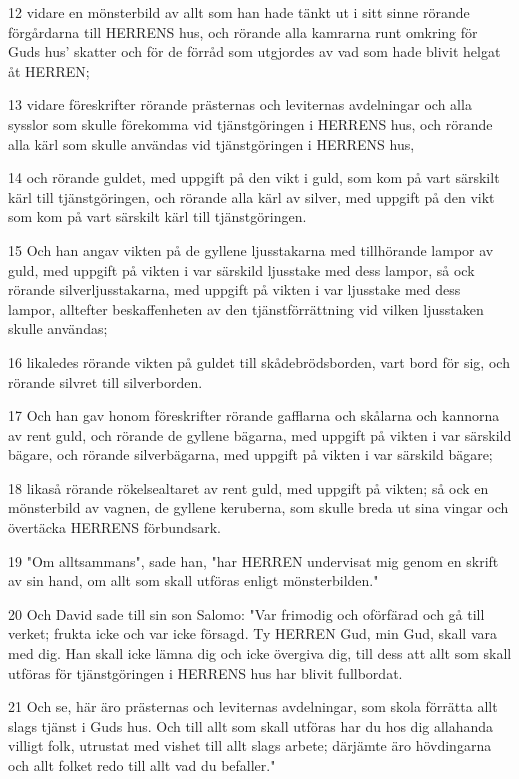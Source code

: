 \par 12 vidare en mönsterbild av allt som han hade tänkt ut i sitt sinne rörande förgårdarna till HERRENS hus, och rörande alla kamrarna runt omkring för Guds hus' skatter och för de förråd som utgjordes av vad som hade blivit helgat åt HERREN;
\par 13 vidare föreskrifter rörande prästernas och leviternas avdelningar och alla sysslor som skulle förekomma vid tjänstgöringen i HERRENS hus, och rörande alla kärl som skulle användas vid tjänstgöringen i HERRENS hus,
\par 14 och rörande guldet, med uppgift på den vikt i guld, som kom på vart särskilt kärl till tjänstgöringen, och rörande alla kärl av silver, med uppgift på den vikt som kom på vart särskilt kärl till tjänstgöringen.
\par 15 Och han angav vikten på de gyllene ljusstakarna med tillhörande lampor av guld, med uppgift på vikten i var särskild ljusstake med dess lampor, så ock rörande silverljusstakarna, med uppgift på vikten i var ljusstake med dess lampor, alltefter beskaffenheten av den tjänstförrättning vid vilken ljusstaken skulle användas;
\par 16 likaledes rörande vikten på guldet till skådebrödsborden, vart bord för sig, och rörande silvret till silverborden.
\par 17 Och han gav honom föreskrifter rörande gafflarna och skålarna och kannorna av rent guld, och rörande de gyllene bägarna, med uppgift på vikten i var särskild bägare, och rörande silverbägarna, med uppgift på vikten i var särskild bägare;
\par 18 likaså rörande rökelsealtaret av rent guld, med uppgift på vikten; så ock en mönsterbild av vagnen, de gyllene keruberna, som skulle breda ut sina vingar och övertäcka HERRENS förbundsark.
\par 19 "Om alltsammans", sade han, "har HERREN undervisat mig genom en skrift av sin hand, om allt som skall utföras enligt mönsterbilden."
\par 20 Och David sade till sin son Salomo: "Var frimodig och oförfärad och gå till verket; frukta icke och var icke försagd. Ty HERREN Gud, min Gud, skall vara med dig. Han skall icke lämna dig och icke övergiva dig, till dess att allt som skall utföras för tjänstgöringen i HERRENS hus har blivit fullbordat.
\par 21 Och se, här äro prästernas och leviternas avdelningar, som skola förrätta allt slags tjänst i Guds hus. Och till allt som skall utföras har du hos dig allahanda villigt folk, utrustat med vishet till allt slags arbete; därjämte äro hövdingarna och allt folket redo till allt vad du befaller."

